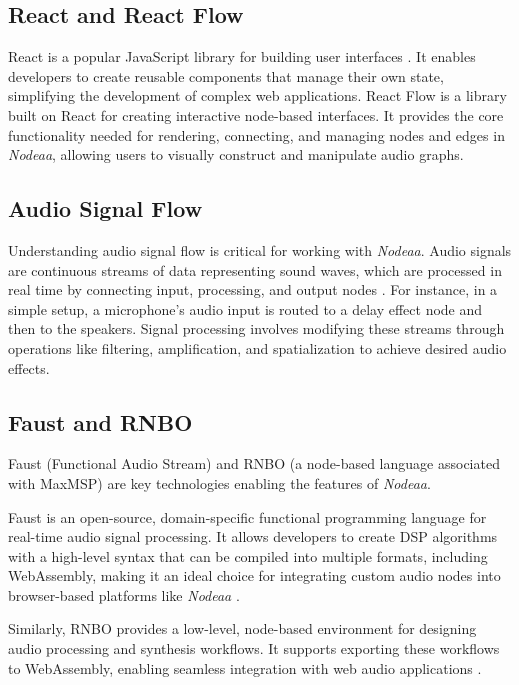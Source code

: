 \documentclass[10pt,twocolumn]{article}
\begin{document}
\subsection{React and React Flow}

React is a popular JavaScript library for building user interfaces \cite{fedosejev2015react}. It enables developers to create reusable components that manage their own state, simplifying the development of complex web applications. React Flow is a library built on React for creating interactive node-based interfaces. It provides the core functionality needed for rendering, connecting, and managing nodes and edges in \textit{Nodeaa}, allowing users to visually construct and manipulate audio graphs.

\subsection{Audio Signal Flow}

Understanding audio signal flow is critical for working with \textit{Nodeaa}. Audio signals are continuous streams of data representing sound waves, which are processed in real time by connecting input, processing, and output nodes \cite{roads1996computer} \cite{wakefield2022generating}. For instance, in a simple setup, a microphone's audio input is routed to a delay effect node and then to the speakers. Signal processing involves modifying these streams through operations like filtering, amplification, and spatialization to achieve desired audio effects.

\subsection{Faust and RNBO}

Faust (Functional Audio Stream) and RNBO (a node-based language associated with MaxMSP) are key technologies enabling the features of \textit{Nodeaa}.

Faust is an open-source, domain-specific functional programming language for real-time audio signal processing. It allows developers to create DSP algorithms with a high-level syntax that can be compiled into multiple formats, including WebAssembly, making it an ideal choice for integrating custom audio nodes into browser-based platforms like \textit{Nodeaa} \cite{orlarey2009faust}.

Similarly, RNBO provides a low-level, node-based environment for designing audio processing and synthesis workflows. It supports exporting these workflows to WebAssembly, enabling seamless integration with web audio applications \cite{kilius2015web}.
\end{document}
